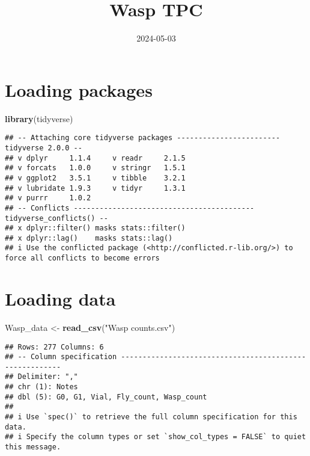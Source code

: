 \documentclass[
]{article}
\title{Wasp TPC}
\author{}
\date{\vspace{-2.5em}2024-05-03}
\newenvironment{Shaded}{\begin{snugshade}}{\end{snugshade}}
\newcommand{\FunctionTok}[1]{\textcolor[rgb]{0.13,0.29,0.53}{\textbf{#1}}}
\newcommand{\NormalTok}[1]{#1}
\newcommand{\OtherTok}[1]{\textcolor[rgb]{0.56,0.35,0.01}{#1}}
\newcommand{\StringTok}[1]{\textcolor[rgb]{0.31,0.60,0.02}{#1}}
\begin{document}
\maketitle

\section{Loading packages}\label{loading-packages}

\begin{Shaded}
\begin{Highlighting}[]
\FunctionTok{library}\NormalTok{(tidyverse)}
\end{Highlighting}
\end{Shaded}

\begin{verbatim}
## -- Attaching core tidyverse packages ------------------------ tidyverse 2.0.0 --
## v dplyr     1.1.4     v readr     2.1.5
## v forcats   1.0.0     v stringr   1.5.1
## v ggplot2   3.5.1     v tibble    3.2.1
## v lubridate 1.9.3     v tidyr     1.3.1
## v purrr     1.0.2     
## -- Conflicts ------------------------------------------ tidyverse_conflicts() --
## x dplyr::filter() masks stats::filter()
## x dplyr::lag()    masks stats::lag()
## i Use the conflicted package (<http://conflicted.r-lib.org/>) to force all conflicts to become errors
\end{verbatim}

\section{Loading data}\label{loading-data}

\begin{Shaded}
\begin{Highlighting}[]
\NormalTok{Wasp\_data }\OtherTok{\textless{}{-}} \FunctionTok{read\_csv}\NormalTok{(}\StringTok{"Wasp counts.csv"}\NormalTok{)}
\end{Highlighting}
\end{Shaded}

\begin{verbatim}
## Rows: 277 Columns: 6
## -- Column specification --------------------------------------------------------
## Delimiter: ","
## chr (1): Notes
## dbl (5): G0, G1, Vial, Fly_count, Wasp_count
## 
## i Use `spec()` to retrieve the full column specification for this data.
## i Specify the column types or set `show_col_types = FALSE` to quiet this message.
\end{verbatim}
\end{document}
